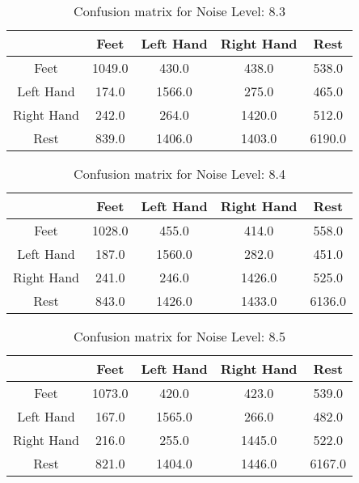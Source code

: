 \begin{table}[!htbp]
    \centering
    \begin{tabular}{|c||c|c|c|c|}
        \hline
		 & Feet & Left Hand & Right Hand & Rest \\
        \hline
        \hline
        Feet & 1049.0 & 430.0 & 438.0 & 538.0 \\
        \hline
        Left Hand & 174.0 & 1566.0 & 275.0 & 465.0 \\
        \hline
        Right Hand & 242.0 & 264.0 & 1420.0 & 512.0 \\
        \hline
        Rest & 839.0 & 1406.0 & 1403.0 & 6190.0 \\
        \hline
    \end{tabular}
    \caption{Confusion matrix for Noise Level: 8.3}
\end{table}

\begin{table}[!htbp]
    \centering
    \begin{tabular}{|c||c|c|c|c|}
        \hline
		 & Feet & Left Hand & Right Hand & Rest \\
        \hline
        \hline
        Feet & 1028.0 & 455.0 & 414.0 & 558.0 \\
        \hline
        Left Hand & 187.0 & 1560.0 & 282.0 & 451.0 \\
        \hline
        Right Hand & 241.0 & 246.0 & 1426.0 & 525.0 \\
        \hline
        Rest & 843.0 & 1426.0 & 1433.0 & 6136.0 \\
        \hline
    \end{tabular}
    \caption{Confusion matrix for Noise Level: 8.4}
\end{table}

\begin{table}[!htbp]
    \centering
    \begin{tabular}{|c||c|c|c|c|}
        \hline
		 & Feet & Left Hand & Right Hand & Rest \\
        \hline
        \hline
        Feet & 1073.0 & 420.0 & 423.0 & 539.0 \\
        \hline
        Left Hand & 167.0 & 1565.0 & 266.0 & 482.0 \\
        \hline
        Right Hand & 216.0 & 255.0 & 1445.0 & 522.0 \\
        \hline
        Rest & 821.0 & 1404.0 & 1446.0 & 6167.0 \\
        \hline
    \end{tabular}
    \caption{Confusion matrix for Noise Level: 8.5}
\end{table}


